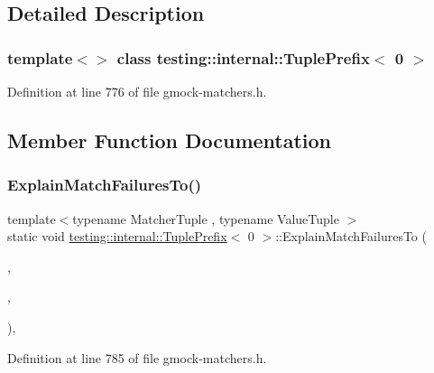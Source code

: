 \subsection{Detailed Description}
\subsubsection*{template$<$$>$\newline
class testing\+::internal\+::\+Tuple\+Prefix$<$ 0 $>$}



Definition at line 776 of file gmock-\/matchers.\+h.



\subsection{Member Function Documentation}
\mbox{\label{classtesting_1_1internal_1_1TuplePrefix_3_010_01_4_aa2980f100d8100e56a0dff1d6df9da57}} 
\subsubsection{\texorpdfstring{Explain\+Match\+Failures\+To()}{ExplainMatchFailuresTo()}}
{\footnotesize\ttfamily template$<$typename Matcher\+Tuple , typename Value\+Tuple $>$ \\
static void \hyperlink{classtesting_1_1internal_1_1TuplePrefix}{testing\+::internal\+::\+Tuple\+Prefix}$<$ 0 $>$\+::Explain\+Match\+Failures\+To (\begin{DoxyParamCaption}\item[{const \hyperlink{structtesting_1_1internal_1_1MatcherTuple}{Matcher\+Tuple} \&}]{,  }\item[{const Value\+Tuple \&}]{,  }\item[{\+::std\+::ostream $\ast$}]{ }\end{DoxyParamCaption})\hspace{0.3cm}{\ttfamily [inline]}, {\ttfamily [static]}}



Definition at line 785 of file gmock-\/matchers.\+h.


